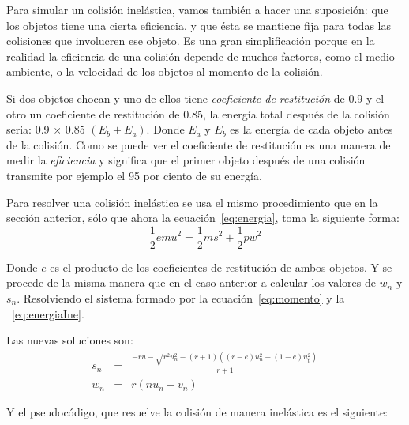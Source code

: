 Para simular un colisión inelástica, vamos también a hacer una suposición: que los objetos tiene una cierta eficiencia, y que ésta se mantiene fija para todas las colisiones que involucren ese objeto. Es una gran simplificación porque en la realidad la eficiencia de una colisión depende de muchos factores, como el medio ambiente, o la velocidad de los objetos al momento de la colisión.

Si dos objetos chocan y uno de ellos tiene \emph{coeficiente de restitución} de 0.9 y el otro un coeficiente de restitución de 0.85, la energía total después de la colisión seria: 0.9 $\times$ 0.85 $\left(  E_b + E_a\right)$. Donde $E_a$ y $E_b$ es la energía de cada objeto antes de la colisión. Como se puede ver el coeficiente de restitución es una manera de medir la \emph{eficiencia} y significa que el primer objeto después de una colisión transmite por ejemplo el 95 por ciento de su energía.

Para resolver una colisión inelástica se usa el mismo procedimiento que en la sección anterior, sólo que ahora la ecuación~\ref{eq:energia}, toma la siguiente forma:
\begin{equation}
 \frac{1}{2} e m \bar{u}^2 = \frac{1}{2} m \bar{s}^2 + \frac{1}{2} p \bar{w}^2
 \label{eq:energiaIne} 
\end{equation} 

Donde $e$ es el producto de los coeficientes de restitución de ambos objetos. Y se procede de la misma manera que en el caso anterior a calcular los valores de $w_n$ y $s_n$. Resolviendo el sistema formado por la ecuación~\ref{eq:momento} y la ~\ref{eq:energiaIne}.

Las nuevas soluciones son: 
\begin{eqnarray}
s_n & = & \frac{-ru - \sqrt{r^{2} u_{n}^{2} - \left( r + 1\right)  \left( (r - e) u_{n}^{2} + (1 -e) u_{t}^{2} \right) } } { r + 1} \nonumber \\
w_n & = & r \left(  n u_n - v_n \right) \nonumber
\end{eqnarray}

Y el pseudocódigo, que resuelve la colisión de manera inelástica es el siguiente:

